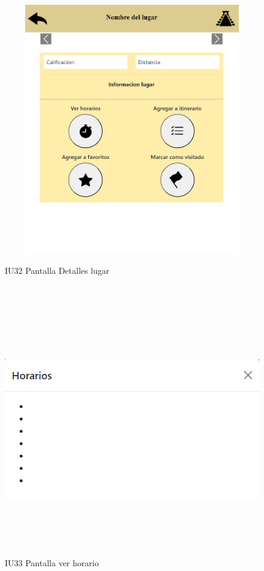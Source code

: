 \begin{figure}[htb]
        \begin{minipage}{1\textwidth}
        \centering
        \includegraphics[width=17cm, height=11cm]{front/PANTALLAS FUNCIONALES 3 DICIEMBRE/IU32_Pantalla Detalles lugar.png}
        \caption{IU32 Pantalla Detalles lugar}
    \end{minipage}%
    \\
        \begin{minipage}{1\textwidth}
        \centering
        \includegraphics[width=17cm, height=11cm]{front/PANTALLAS FUNCIONALES 3 DICIEMBRE/IU33_Pantalla ver horario.png}
        \caption{IU33 Pantalla ver horario}
    \end{minipage}%
\end{figure}



